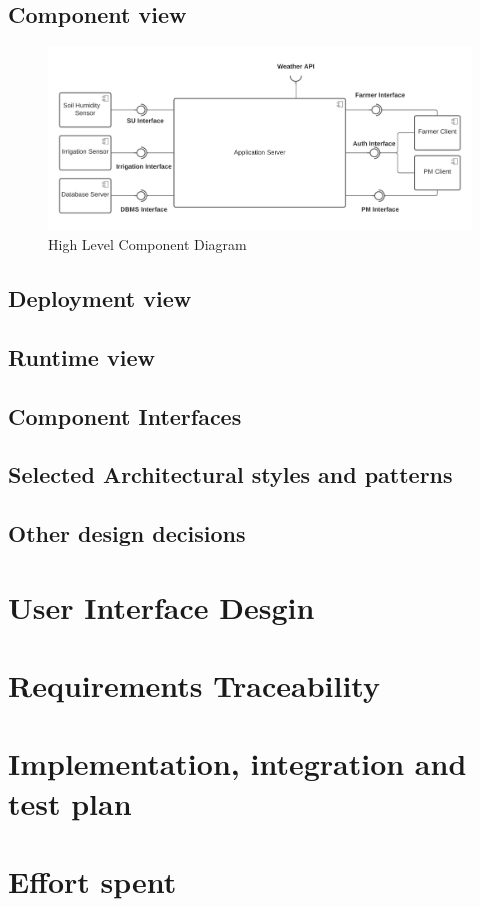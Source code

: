\documentclass[10pt]{article} %
\begin{document}
\subsection{Component view}
\begin{figure}[h]
    \centering
    \includegraphics[scale=0.64]{images/hl_component.png}
    \caption{High Level Component Diagram}
    \label{fig:hl_component}
\end{figure}
\subsection{Deployment view}
\subsection{Runtime view}
\subsection{Component Interfaces}
\subsection{Selected Architectural styles and patterns}
\subsection{Other design decisions}

\section{User Interface Desgin}

\section{Requirements Traceability}

\section{Implementation, integration and test plan}

\section{Effort spent}


\end{document}
